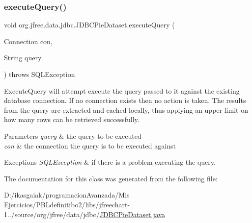 \subsubsection{\texorpdfstring{execute\+Query()}{executeQuery()}\hspace{0.1cm}{\footnotesize\ttfamily [2/2]}}
{\footnotesize\ttfamily void org.\+jfree.\+data.\+jdbc.\+J\+D\+B\+C\+Pie\+Dataset.\+execute\+Query (\begin{DoxyParamCaption}\item[{Connection}]{con,  }\item[{String}]{query }\end{DoxyParamCaption}) throws S\+Q\+L\+Exception}

Execute\+Query will attempt execute the query passed to it against the existing database connection. If no connection exists then no action is taken. The results from the query are extracted and cached locally, thus applying an upper limit on how many rows can be retrieved successfully.


\begin{DoxyParams}{Parameters}
{\em query} & the query to be executed \\
\hline
{\em con} & the connection the query is to be executed against\\
\hline
\end{DoxyParams}

\begin{DoxyExceptions}{Exceptions}
{\em S\+Q\+L\+Exception} & if there is a problem executing the query. \\
\hline
\end{DoxyExceptions}


The documentation for this class was generated from the following file\+:\begin{DoxyCompactItemize}
\item 
D\+:/ikasgaiak/programacion\+Avanzada/\+Mis Ejercicios/\+P\+B\+Ldefinitibo2/libs/jfreechart-\/1../source/org/jfree/data/jdbc/\mbox{\hyperlink{_j_d_b_c_pie_dataset_8java}{J\+D\+B\+C\+Pie\+Dataset.\+java}}\end{DoxyCompactItemize}
